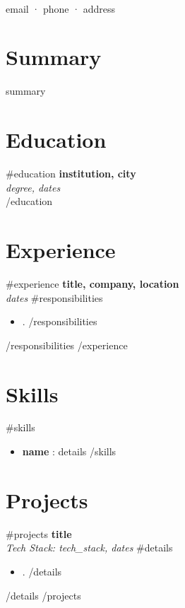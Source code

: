 \documentclass[a4paper,11pt]{article}
\begin{document}
\begin{center}
    {\Huge {}} \\
    {\small {{email}} · {{phone}} · {{address}}}
\end{center}

\section*{Summary}
{{summary}}

\section*{Education}
{{#education}}
\textbf{ {{institution}}, {{city}} } \\
\textit{ {{degree}}, {{dates}} } \\
{{/education}}

\section*{Experience}
{{#experience}}
\textbf{ {{title}}, {{company}}, {{location}} } \\
\textit{ {{dates}} }
{{#responsibilities}}
\begin{itemize}[noitemsep]
    {{#responsibilities}}
    \item {{.}}
    {{/responsibilities}}
\end{itemize}
{{/responsibilities}}
{{/experience}}

\section*{Skills}
{{#skills}}
\begin{itemize}[noitemsep]
    \item \textbf{ {{name}} }: {{details}}
{{/skills}}
\end{itemize}

\section*{Projects}
{{#projects}}
\textbf{ {{title}} } \\
\textit{ Tech Stack: {{tech_stack}}, {{dates}} }
{{#details}}
\begin{itemize}[noitemsep]
    {{#details}}
    \item {{.}}
    {{/details}}
\end{itemize}
{{/details}}
{{/projects}}
\end{document}

